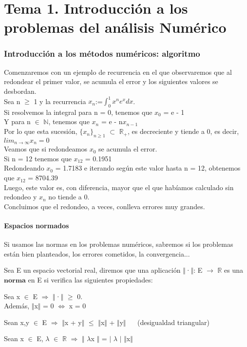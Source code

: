 \part{Tema 1. Introducción a los problemas del análisis Numérico}

\section{Introducción a los métodos numéricos: algoritmo}
Comenzaremos con un ejemplo de recurrencia en el que observaremos que al redondear el primer valor, se acumula el error y los siguientes valores se desbordan.\\
Sea n $\geq$ 1 y la recurrencia $x_{n}$:=$\int_{0}^{1} x^{n}e^{x}dx$.\\
Si resolvemos la integral para n = 0, tenemos que $x_{0}$ = e - 1\\
Y para n $\in$ $\mathbb{N}$, tenemos que $x_{n}$ = e - n$x_{n-1}$\\
Por lo que esta sucesión, $\lbrace x_{n} \rbrace_{n\geq1}$ $\subset$ $\mathbb{R_{+}}$, es decreciente y tiende a 0, es decir, $lim_{n \to \infty} x_{n} = 0 $ \\
Veamos que si redondeamos $x_{0}$ se acumula el error.\\
Si n = 12 tenemos que $x_{12}$ = 0.1951\\
Redondeando $x_{0}$ = 1.7183 e iterando según este valor hasta n = 12, obtenemos que $x_{12}$ = 8704.39\\
Luego, este valor es, con diferencia, mayor que el que habíamos calculado sin redondeo y $x_{n}$ no tiende a 0.\\
Concluimos que el redondeo, a veces, conlleva errores muy grandes.

\subsection{Espacios normados}
Si usamos las normas en los problemas numéricos, sabremos si los problemas están bien planteados, los errores cometidos, la convergencia...

\begin{ndef}[Norma] 
Sea E un espacio vectorial real, diremos que una aplicación $\Vert$·$\Vert$: E $\rightarrow$ $\mathbb{R}$ es una $\textbf{norma}$ en E si verifica las siguientes propiedades:
	\begin{nlist}
	\item Sea x $\in$ E $\Rightarrow$ $\Vert$·$\Vert$ $\geq$ 0.\\
	Además, $\Vert$x$\Vert$ = 0 $\Leftrightarrow$ x = 0
	\item Sean x,y $\in$ E $\Rightarrow$ $\Vert$x + y$\Vert$ $\leq$ $\Vert$x$\Vert$ + $\Vert$y$\Vert$ $\quad$ (desigualdad triangular)
	\item Sean x $\in$ E, $\lambda$ $\in$ $\mathbb{R}$ $\Rightarrow$ $\Vert$ $	\lambda$x $\Vert$ = $\vert$ $\lambda$ $\vert$ $\Vert$x$\Vert$
	\end{nlist}
\end{ndef}

